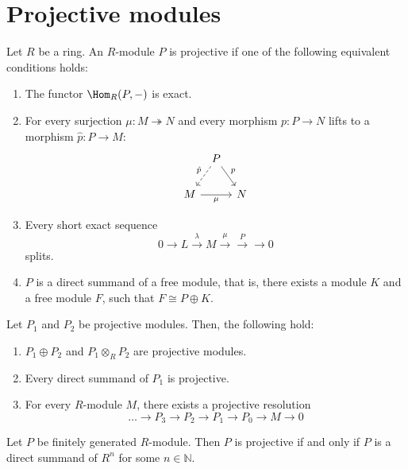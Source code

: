 \section{Projective modules}

\begin{definition}
  Let $R$ be a ring.
  An $R$-module $P$ is projective if one of the following equivalent
  conditions holds:
   \begin{enumerate}[p]
    \item The functor $\Hom_R(P, \dash)$ is exact.
    \item For every surjection $\mu \colon  M \twoheadrightarrow N$
      and every morphism $p\colon P \to N$ lifts to a morphism
      $\hat{p} \colon  P \to  M$:
      \[
      \begin{tikzcd}[column sep = tiny]
      & P \ar[swap,dashed]{dl}{\hat{p}} \ar{dr}{p} \\
      M \ar[swap]{rr}{\mu} & & N
      \end{tikzcd}
      \]
    \item Every short exact sequence
      \[
      0 \to  L \xrightarrow{λ} M \xrightarrow{\mu} \xrightarrow{P} \to 0
      \] 
      splits.
    \item $P$ is a direct summand of a free module,
      that is, there exists a module $K$ and a free module  $F$,
      such that  $F \cong P \oplus K$.
  \end{enumerate}
\end{definition}

\begin{lemma}
  Let $P_1$ and $P_2$ be projective modules.
  Then, the following hold:
  \begin{enumerate}[h]
    \item
      $P_1 \oplus P_2$ and $P_1 \otimes _R P_2$
      are projective modules.
    \item Every direct summand of $P_1$ is projective.
    \item For every $R$-module  $M$, there exists a projective resolution
       \[
      \ldots \to P_3 \to P_2 \to P_1 \to P_0 \to  M \to  0
      \] 
  \end{enumerate}
\end{lemma}

\begin{lemma}
  Let $P$ be finitely generated $R$-module.
  Then  $P$ is projective if and only if  $P$ is a direct summand
  of  $R^n$ for some $n\in \mathbb{N}$.
\end{lemma}


